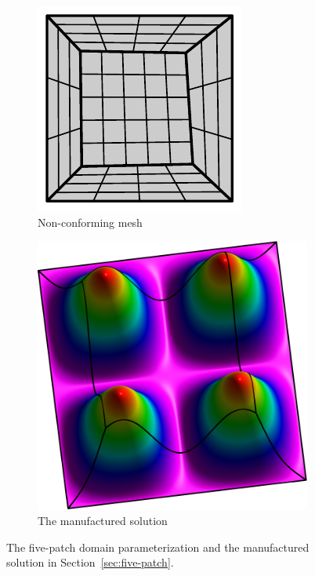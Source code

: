 \begin{figure}[ht]
	\centering
	\begin{subfigure}[b]{0.33\textwidth}
		\includegraphics[width=\textwidth]{five_patch_basic}
		\caption{Non-conforming mesh}
	\end{subfigure}
	\begin{subfigure}[b]{0.34\textwidth}
		\includegraphics[width=\textwidth]{five_patch_solution-plot}
		\caption{The manufactured solution}
	\end{subfigure}
	\caption{The five-patch domain parameterization and the manufactured solution in Section~\ref{sec:five-patch}.}\label{fig:five_patch_biharmonic_problem}
\end{figure}


